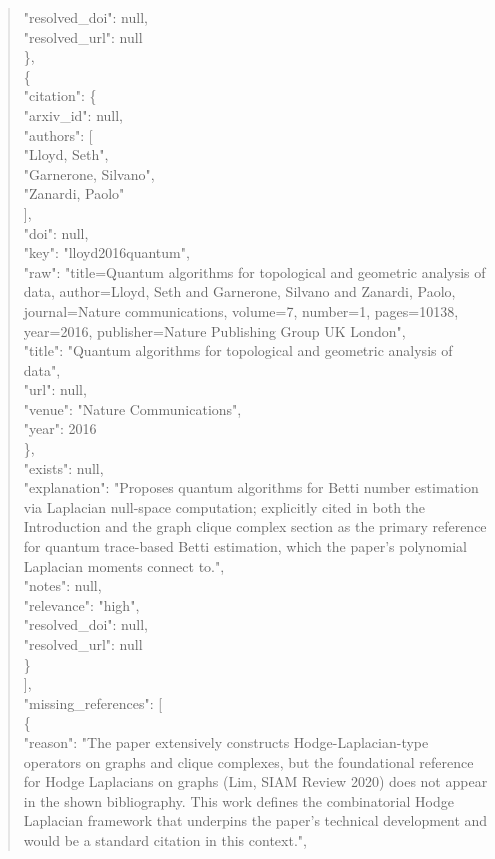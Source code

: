 \documentclass[11pt]{article}
\begin{document}
\begin{quote}
      "resolved\_doi": null,\\
      "resolved\_url": null\\
    \},\\
    \{\\
      "citation": \{\\
        "arxiv\_id": null,\\
        "authors": [\\
          "Lloyd, Seth",\\
          "Garnerone, Silvano",\\
          "Zanardi, Paolo"\\
        ],\\
        "doi": null,\\
        "key": "lloyd2016quantum",\\
        "raw": "title=Quantum algorithms for topological and geometric analysis of data, author=Lloyd, Seth and Garnerone, Silvano and Zanardi, Paolo, journal=Nature communications, volume=7, number=1, pages=10138, year=2016, publisher=Nature Publishing Group UK London",\\
        "title": "Quantum algorithms for topological and geometric analysis of data",\\
        "url": null,\\
        "venue": "Nature Communications",\\
        "year": 2016\\
      \},\\
      "exists": null,\\
      "explanation": "Proposes quantum algorithms for Betti number estimation via Laplacian null-space computation; explicitly cited in both the Introduction and the graph clique complex section as the primary reference for quantum trace-based Betti estimation, which the paper's polynomial Laplacian moments connect to.",\\
      "notes": null,\\
      "relevance": "high",\\
      "resolved\_doi": null,\\
      "resolved\_url": null\\
    \}\\
  ],\\
  "missing\_references": [\\
    \{\\
      "reason": "The paper extensively constructs Hodge-Laplacian-type operators on graphs and clique complexes, but the foundational reference for Hodge Laplacians on graphs (Lim, SIAM Review 2020) does not appear in the shown bibliography. This work defines the combinatorial Hodge Laplacian framework that underpins the paper's technical development and would be a standard citation in this context.",\\

\end{quote}
\end{document}
